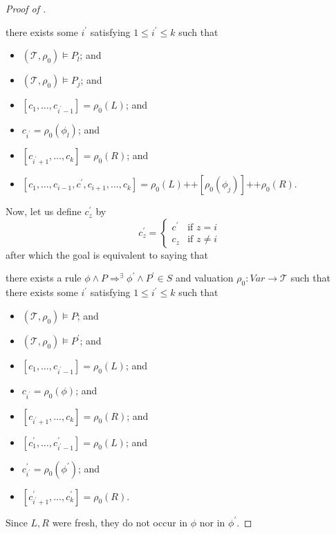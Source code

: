 \begin{proof}[Proof of ]
\begin{proofenv}
there exists some $i^\prime$ satisfying $1 \leq i^\prime \leq k$
such that
\begin{itemize}
    \item $(\mathcal{T}, \rho_0) \vDash P_l$; and
    \item $(\mathcal{T}, \rho_0) \vDash P_j$; and
    \item $[c_1,\ldots, c_{i^\prime-1}] = \rho_0(L)$; and
    \item $c_{i^\prime} = \rho_0(\phi_l)$; and
    \item $[c_{i^\prime+1},\ldots,c_k] = \rho_0(R)$; and
    \item $[c_1, \ldots, c_{i-1}, c^\prime, c_{i+1}, \ldots, c_k] = \rho_0(L)
    \texttt{++} [\rho_0(\phi_j)] 
    \texttt{++} \rho_0(R)$.
\end{itemize}
\end{proofenv}
Now, let us define $c^\prime_{z}$ by
\begin{equation*}
c^\prime_{z} =
    \begin{cases}
        c^\prime & \text{if } z = i \\
        c_z & \text{if } z \not = i
    \end{cases}
\end{equation*}
after which the goal is equivalent to saying that
\begin{proofenv}
there exists a rule $\phi \land P \Rightarrow^\exists \phi^\prime \land P^\prime \in S$
and valuation $\rho_0 : \mathit{Var} \to \mathcal{T}$ such that
there exists some $i^\prime$ satisfying $1 \leq i^\prime \leq k$ such that
\begin{itemize}
    \item $(\mathcal{T}, \rho_0) \vDash P$; and
    \item $(\mathcal{T}, \rho_0) \vDash P^\prime$; and
    \item $[c_1,\ldots, c_{i^\prime-1}] = \rho_0(L)$; and
    \item $c_{i^\prime} = \rho_0(\phi)$; and
    \item $[c_{i^\prime+1},\ldots,c_k] = \rho_0(R)$; and
    \item $[c^\prime_1,\ldots, c^\prime_{i^\prime-1}] = \rho_0(L)$; and
    \item $c^\prime_{i^\prime} = \rho_0(\phi^\prime)$; and
    \item $[c^\prime_{i^\prime+1},\ldots,c^\prime_k] = \rho_0(R)$.
\end{itemize}
\end{proofenv}
Since $L,R$ were fresh, they do not occur in $\phi$ nor in $\phi^\prime$.

\end{proof}
